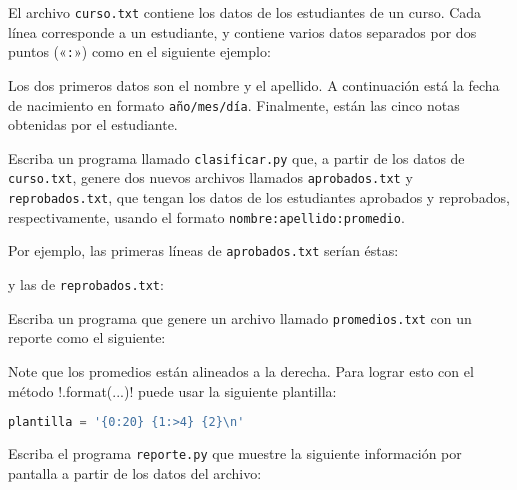 \lstset{language=file,frame=single}

El archivo \texttt{curso.txt} contiene los datos
de los estudiantes de un curso.
Cada línea corres\-ponde a un estudiante,
y contiene varios datos separados por dos puntos («\verb+:+»)
como en el si\-guiente ejemplo:


Los dos primeros datos son el nombre y el apellido.
A conti\-nua\-ción está la fecha de nacimiento
en formato \texttt{año/mes/día}.
Finalmente, están las cinco notas obtenidas por el estudiante.

\newpage
\begin{certamen}

    \item
      Escriba un programa llamado \texttt{clasificar.py} que,
      a partir de los datos de \texttt{curso.txt},
      genere dos nuevos archivos
      llamados \texttt{aprobados.txt} y \texttt{reprobados.txt},
      que tengan los datos de los estudiantes aprobados y reprobados,
      respectivamente,
      usando el formato \texttt{nombre:apellido:promedio}.

      Por ejemplo,
      las primeras líneas de \texttt{aprobados.txt} serían éstas:
      
      y las de \texttt{reprobados.txt}:
      

      \newpage

    \item
      Escriba un programa que genere un archivo llamado \texttt{promedios.txt}
      con un reporte como el siguiente:
      

      Note que los promedios están alineados a la derecha.
      Para lograr esto con el método \li!.format(...)!
      puede usar la siguiente plantilla:
      \begin{lstlisting}[language=py,frame=none]
plantilla = '{0:20} {1:>4} {2}\n'
      \end{lstlisting}

      \newpage

    \item
      Escriba el programa \texttt{reporte.py}
      que muestre la siguiente información por pantalla
      a partir de los datos del archivo:
      

      \newpage


\end{certamen}
